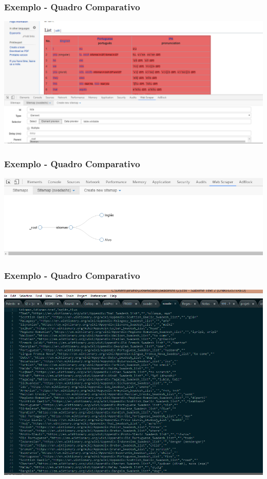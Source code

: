 \documentclass{beamer}
\begin{document}
\begin{frame}
\frametitle{Exemplo - Quadro Comparativo}
\includegraphics[width=\textwidth]{comparative3.png}
\end{frame}

\begin{frame}
\frametitle{Exemplo - Quadro Comparativo}
\includegraphics[width=\textwidth]{comparative4.png}
\end{frame}

\begin{frame}
\frametitle{Exemplo - Quadro Comparativo}
\includegraphics[width=\textwidth]{comparative5.png}
\end{frame}
\end{document}
